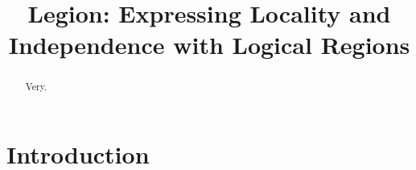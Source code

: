\documentclass[9pt,nocopyrightspace]{sigplanconf}
\begin{document}
\title{Legion: Expressing Locality and Independence with Logical Regions}
\authorinfo{}{}{}
\maketitle

\begin{abstract}
Very.
\end{abstract}

\section{Introduction}
\label{sect:intro}














{
\small

}
\end{document}
